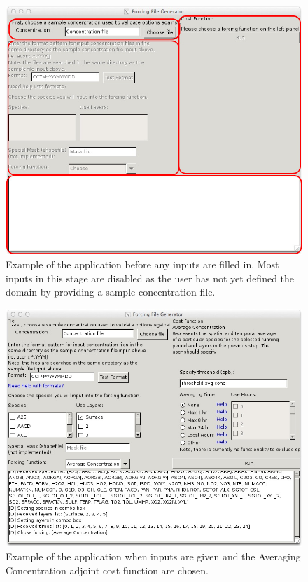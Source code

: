 \documentclass{article}
\begin{document}
\begin{figure}
	\centering
	\includegraphics[width=\textwidth]{Forcing_App_Layout.jpg}
	\caption{Example of the application before any inputs are filled in.  Most inputs in this stage are disabled as the user has not yet defined the domain by providing a sample concentration file.}
	\label{ss}
\end{figure}

\begin{figure}
	\centering
	\includegraphics[width=\textwidth]{Forcing_App_Layout-filled.jpg}
	\caption{Example of the application when inputs are given and the Averaging Concentration adjoint cost function are chosen.}
	\label{ssfilled}
\end{figure}
\end{document}
